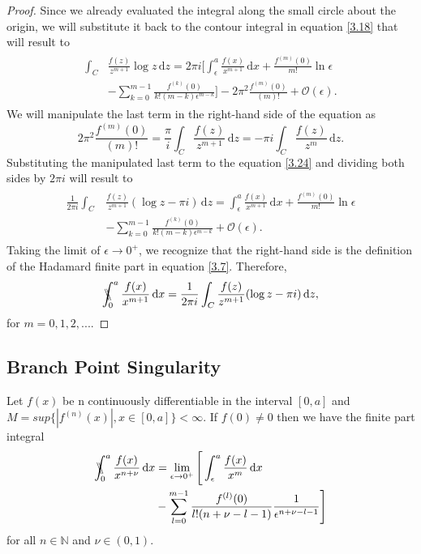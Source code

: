 \begin{proof}
Since we already evaluated the integral along the small circle about the origin, we will substitute it back to the contour integral in equation \eqref{3.18} that will result to
\begin{align}
\begin{split}
     \int_{C} & \frac{f(z)}{z^{m+1}} \log z \, \mathrm{d}z = 2 \pi i \bigg[ \int_{\epsilon}^a \frac{f(x)}{x^{m+1}} \, \mathrm{d}x +  \frac{f^{(m)}(0)}{m!} \ln \epsilon \\&  - \sum_{k=0}^{m-1} \frac{f^{(k)}(0)}{k!(m-k) \epsilon^{m-k}} \bigg] - 2 \pi^{2} \frac{f^{(m)}(0)}{(m)!} + \mathcal{O}(\epsilon).
    \label{3.24}
\end{split}
\end{align}
We will manipulate the last term in the right-hand side of the equation as
\begin{equation}
    2 \pi^{2} \frac{f^{(m)}(0)}{(m)!} = \frac{\pi}{i} \int_{C} \frac{f(z)}{z^{m+1}} \, \mathrm{d}z = -\pi i \int_C \frac{f(z)}{z^m} \, \mathrm{d}z.
\end{equation}
Substituting the manipulated last term to the equation \eqref{3.24} and dividing both sides by $2 \pi i$ will result to 
\begin{align}
\begin{split}
     \frac{1}{2 \pi i}\int_{C} & \frac{f(z)}{z^{m+1}} (\log z - \pi i) \, \mathrm{d}z = \int_{\epsilon}^a \frac{f(x)}{x^{m+1}} \, \mathrm{d}x +  \frac{f^{(m)}(0)}{m!} \ln \epsilon \\&  - \sum_{k=0}^{m-1} \frac{f^{(k)}(0)}{k!(m-k) \epsilon^{m-k}} + \mathcal{O}(\epsilon).
\end{split}
\end{align}
Taking the limit of $\epsilon \to 0^{+}$, we recognize that the right-hand side is the definition of the Hadamard finite part in equation \eqref{3.7}. Therefore, 
\begin{equation}
    \bbint{0}{a} \frac{f(x)}{x^{m+1}} \, \mathrm{d}x = \frac{1}{2 \pi i} \int_C \frac{f(z)}{z^{m+1}} (\log z - \pi i) \, \mathrm{d}z,
\end{equation}
for  $m = 0, 1,2, ...$.
\end{proof}

\subsection{Branch Point Singularity}
\begin{proposition}
Let $f(x)$ be n continuously differentiable in the interval $[0,a]$ and $M=sup\{ |f^{(n)}(x)|, x \in [0,a]\} < \infty$. If $f(0) \neq 0$ then we have the finite part integral
\begin{align}
\begin{split}
    \bbint{0}{a} \frac{f(x)}{x^{n+\nu}} \, \mathrm{d}x & = \lim_{\epsilon \to 0^{+}} \Bigg[ \int_\epsilon^a \frac{f(x)}{x^m} \, \mathrm{d}x \\& - \sum_{l=0}^{m-1} \frac{f^{(l)}(0)}{l! (n+\nu-l-1)}\frac{1}{\epsilon^{n+\nu-l-1}} \Bigg] 
\label{P2}
\end{split}
\end{align}
for all $n \in \mathbb{N}$ and $\nu \in (0,1)$.
\end{proposition}

